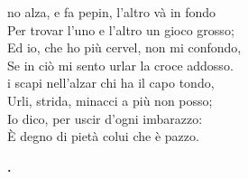 \documentclass[11pt,a6paper]{article}
\begin{document}
\noindent
\begin{minipage}{8cm}
\-\hspace{-6pt}{\LARGE U}no alza, e fa pepin, l'altro và in fondo\\
Per trovar l'uno e l'altro un gioco grosso; \vspace{2pt}\\ 
Ed io, che ho più cervel, non mi confondo, \\
Se in ciò mi sento urlar la croce addosso. \vspace{2pt}\\
\-\hspace{-6pt}{\LARGE S}i scapi nell'alzar chi ha il capo tondo, \\
Urli, strida, minacci a più non posso; \vspace{2pt}\\
Io dico, per uscir d'ogni imbarazzo: \\
È degno di pietà colui che è pazzo. 
\end{minipage}

\vfill

\vfill

\huge\bfseries\centering{}.
\end{document}
